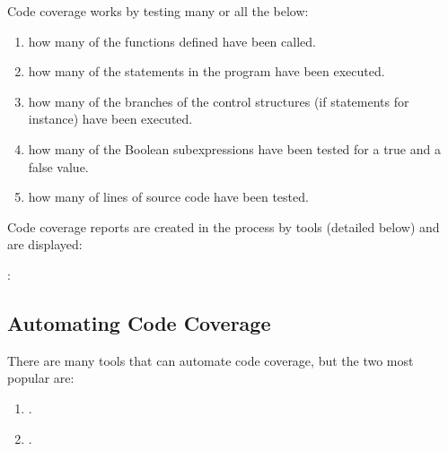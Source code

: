 \documentclass[letterpaper,10pt,english]{jupyterBook}
\begin{document}
\sphinxAtStartPar
Code coverage works by testing many or all the below:
\begin{enumerate}
%
\item {} 
\sphinxAtStartPar
{} how many of the functions defined have been
called.

\item {} 
\sphinxAtStartPar
{} how many of the statements in the program have
been executed.

\item {} 
\sphinxAtStartPar
{} how many of the branches of the control
structures (if statements for instance) have been executed.

\item {} 
\sphinxAtStartPar
{} how many of the Boolean sub\sphinxhyphen{}expressions have
been tested for a true and a false value.

\item {} 
\sphinxAtStartPar
{} how many of lines of source code have been tested.

\end{enumerate}

\sphinxAtStartPar
Code coverage reports are created in the process by tools (detailed
below) and are displayed:

\sphinxAtStartPar
{}

\sphinxAtStartPar
{}: 


\subsection{Automating Code Coverage}
\label{\detokenize{chapter_13/testing:automating-code-coverage}}
\sphinxAtStartPar
There are many tools that can automate code coverage, but the two most
popular are:
\begin{enumerate}
%
\item {} 
\sphinxAtStartPar
{}.

\item {} 
\sphinxAtStartPar
{}.

\end{enumerate}
\end{document}

